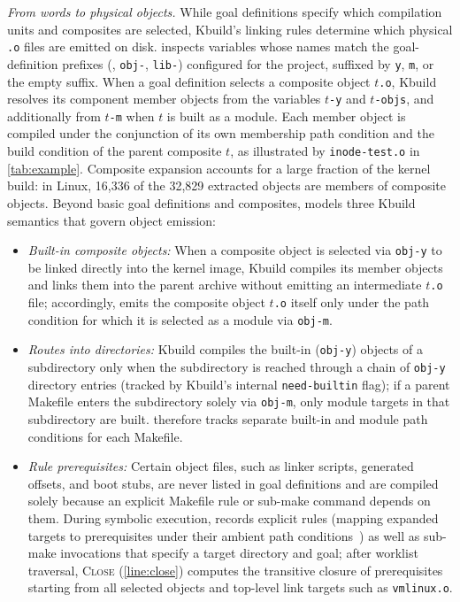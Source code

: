\documentclass[acmsmall,screen,review,anonymous,nonacm]{acmart}
\begin{document}
  \emph{From words to physical objects.}
  While goal definitions specify which compilation units and composites are selected, Kbuild's linking rules determine which physical \texttt{.o} files are emitted on disk.
  \tool{} inspects variables whose names match the goal-definition prefixes (\eg, \texttt{obj-}, \texttt{lib-}) configured for the project, suffixed by \texttt{y}, \texttt{m}, or the empty suffix.
  When a goal definition selects a composite object $t$\texttt{.o}, Kbuild resolves its component member objects from the variables $t$\texttt{-y} and $t$\texttt{-objs}, and additionally from $t$\texttt{-m} when $t$ is built as a module.
  Each member object is compiled under the conjunction of its own membership path condition and the build condition of the parent composite $t$, as illustrated by \texttt{inode-test.o} in \autoref{tab:example}.
  Composite expansion accounts for a large fraction of the kernel build: in Linux, 16,336 of the 32,829 extracted objects are members of composite objects.
  Beyond basic goal definitions and composites, \tool{} models three Kbuild semantics that govern object emission:
  \begin{itemize}[leftmargin=1.5em]
    \item \emph{Built-in composite objects:} When a composite object is selected via \texttt{obj-y} to be linked directly into the kernel image, Kbuild compiles its member objects and links them into the parent archive without emitting an intermediate $t$\texttt{.o} file; accordingly, \tool{} emits the composite object $t$\texttt{.o} itself only under the path condition for which it is selected as a module via \texttt{obj-m}.
    \item \emph{Routes into directories:} Kbuild compiles the built-in (\texttt{obj-y}) objects of a subdirectory only when the subdirectory is reached through a chain of \texttt{obj-y} directory entries (tracked by Kbuild's internal \texttt{need-builtin} flag); if a parent Makefile enters the subdirectory solely via \texttt{obj-m}, only module targets in that subdirectory are built. \tool{} therefore tracks separate built-in and module path conditions for each Makefile.
    \item \emph{Rule prerequisites:} Certain object files, such as linker scripts, generated offsets, and boot stubs, are never listed in goal definitions and are compiled solely because an explicit Makefile rule or sub-make command depends on them. During symbolic execution, \tool{} records explicit rules (mapping expanded targets to prerequisites under their ambient path conditions~\cite{gazzillo2017kmax,tamrawi2012symmake}) as well as sub-make invocations that specify a target directory and goal; after worklist traversal, \textsc{Close} (\autoref{line:close}) computes the transitive closure of prerequisites starting from all selected objects and top-level link targets such as \texttt{vmlinux.o}.
  \end{itemize}
\end{document}
